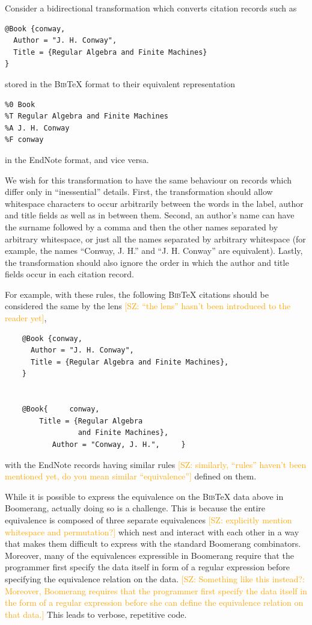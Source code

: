 \documentclass{svproc}
\newcommand{\FINISH}[3]{\ifdraft\textcolor{#1}{[#2: #3]}\fi}
\newcommand{\saz}[1]{\FINISH{orange}{SZ}{#1}}
\newcommand{\bibtex}{\textsc{Bib}\TeX{}}
\begin{document}
Consider a bidirectional transformation which converts citation records such as
\begin{verbatim}
@Book {conway,
  Author = "J. H. Conway",
  Title = {Regular Algebra and Finite Machines}
}
\end{verbatim}

\noindent stored in the \bibtex{} format to their equivalent representation 
\begin{verbatim}
%0 Book
%T Regular Algebra and Finite Machines
%A J. H. Conway
%F conway
\end{verbatim}

\noindent in the EndNote format, and vice versa. 

We wish for this transformation to have the same behaviour on records which
differ only in ``inessential'' details. First, the transformation
should allow whitespace characters to occur arbitrarily between the words in the
label, author and title fields as well as in between them. Second, an
author's name can have the surname followed by a comma and then the other
names separated by arbitrary whitespace, or just all the names separated by
arbitrary whitespace (for example, the names ``Conway, J. H.'' and ``J. H.
Conway'' are equivalent). Lastly, the transformation should also ignore the
order in which the author and title fields occur in each citation record.

For example, with these rules, the following \bibtex{} citations should be
considered the same by the lens \saz{``the lens'' hasn't been introduced to the
  reader yet},
\begin{verbatim}
    @Book {conway,
      Author = "J. H. Conway",
      Title = {Regular Algebra and Finite Machines},
    }


    @Book{     conway,
        Title = {Regular Algebra 
                 and Finite Machines},
           Author = "Conway, J. H.",     }
\end{verbatim}
with the EndNote records having similar rules \saz{similarly, ``rules'' haven't been
  mentioned yet, do you mean similar ``equivalence''} defined on them.

While it is possible to express the equivalence on the \bibtex{} data above in
Boomerang, actually doing so is a challenge. This is because the entire
equivalence is composed of three separate equivalences \saz{explicitly mention
  whitespace and permutation?} which nest and interact
with each other in a way that makes them difficult to express with the standard
Boomerang combinators. Moreover, many of the equivalences expressible in
Boomerang require that the programmer first specify the data itself in form of
a regular expression before specifying the equivalence relation on the data.
\saz{Something like this instead?:  Moreover, Boomerang requires that the
  programmer first specify the data itself in the form of a regular expression
  before she can define the equivalence relation on that data.}
This leads to verbose, repetitive code.
\end{document}
